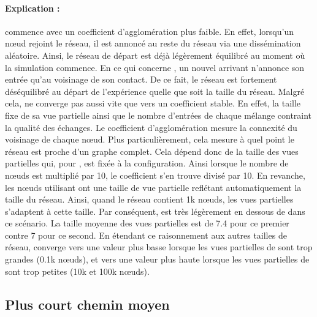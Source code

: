 \paragraph{Explication :} \CYCLON commence avec un coefficient d'agglomération
plus faible. En effet, lorsqu'un nœud rejoint le réseau, il est annoncé au reste
du réseau via une dissémination aléatoire. Ainsi, le réseau de départ est déjà
légèrement équilibré au moment où la simulation commence. En ce qui concerne
\SPRAY, un nouvel arrivant n'annonce son entrée qu'au voisinage de son
contact. De ce fait, le réseau est fortement déséquilibré au départ de
l'expérience quelle que soit la taille du réseau. Malgré cela, \CYCLON ne
converge pas aussi vite que \SPRAY vers un coefficient stable. En effet, la
taille fixe de sa vue partielle ainsi que le nombre d'entrées de chaque mélange
contraint la qualité des échanges.  Le coefficient d'agglomération mesure la
connexité du voisinage de chaque nœud. Plus particulièrement, cela mesure à quel
point le réseau est proche d'un graphe complet. Cela dépend donc de la taille
des vues partielles qui, pour \CYCLON, est fixée à la configuration.  Ainsi
lorsque le nombre de nœuds est multiplié par 10, le coefficient s'en trouve
divisé par 10. En revanche, les nœuds utilisant \SPRAY ont une taille de vue
partielle reflétant automatiquement la taille du réseau.  Ainsi, quand le réseau
contient 1k nœuds, les vues partielles s'adaptent à cette taille. Par
conséquent, \SPRAY est très légèrement en dessous de \CYCLON dans ce
scénario. La taille moyenne des vues partielles est de 7.4 pour ce premier
contre 7 pour ce second. En étendant ce raisonnement aux autres tailles de
réseau, \SPRAY converge vers une valeur plus basse lorsque les vues partielles
de \CYCLON sont trop grandes (0.1k nœuds), et vers une valeur plus haute lorsque
les vues partielles de \CYCLON sont trop petites (10k et 100k nœuds).

\subsection{Plus court chemin moyen}
\label{net:subsec:shortestpath}

